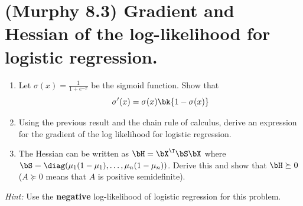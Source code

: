 \documentclass[189]{pset}
\begin{document}

  \section{(Murphy 8.3) Gradient and Hessian of the log-likelihood for
    logistic regression.}

    \begin{enumerate}
      \item Let $\sigma(x) = \frac{1}{1 + e^{-x}}$ be the sigmoid
        function. Show that
        \[
          \sigma'(x) = \sigma(x)\bk{1 - \sigma(x)}
        \]
      \item Using the previous result and the chain rule of calculus,
        derive an expression for the gradient of the log likelihood
        for logistic regression.
      \item The Hessian can be written as $\bH=\bX^\T\bS\bX$ where
        $\bS = \diag(\mu_1(1-\mu_1), \dots, \mu_n(1-\mu_n))$. Derive
        this and show that $\bH \succeq 0$ ($A \succeq 0$ means that
        $A$ is positive semidefinite).
    \end{enumerate}

    \textit{Hint:} Use the \textbf{negative} log-likelihood of
    logistic regression for this problem.

  \hrulefill
\end{document}
